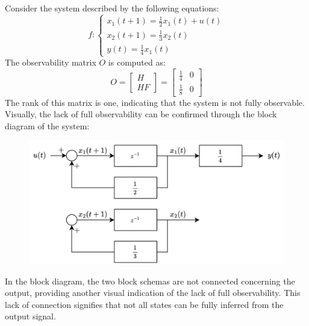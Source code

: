 \begin{example}
    Consider the system described by the following equations:
    \[f:\begin{cases}
        x_1(t+1)=\frac{1}{2}x_1(t)+u(t) \\
        x_2(t+1)=\frac{1}{3}x_2(t) \\
        y(t)=\frac{1}{4}x_1(t)
    \end{cases}\]
    The observability matrix $O$ is computed as:
    \[O=\begin{bmatrix} H \\ HF \end{bmatrix}=\begin{bmatrix} \frac{1}{4} & 0 \\ \frac{1}{8} & 0 \end{bmatrix}\]
    The rank of this matrix is one, indicating that the system is not fully observable.
    Visually, the lack of full observability can be confirmed through the block diagram of the system:
    \begin{figure}[H]
        \centering
        \includegraphics[width=0.6\linewidth]{images/block.png}
    \end{figure}
    In the block diagram, the two block schemas are not connected concerning the output, providing another visual indication of the lack of full observability. 
    This lack of connection signifies that not all states can be fully inferred from the output signal.
\end{example}
